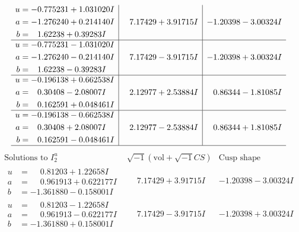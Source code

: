 \documentclass[1p]{elsarticle_modified}
\theoremstyle{definition}
\newcommand{\I}{\sqrt{-1}}
\begin{document}
$$\begin{array}{c|c|c}
\begin{aligned}
u &= -0.775231 + 1.031020 I \\
a &= -1.276240 + 0.214140 I \\
b &= \phantom{-}1.62238 + 0.39283 I\end{aligned}
 & \phantom{-}7.17429 + 3.91715 I & -1.20398 - 3.00324 I \\ \hline\begin{aligned}
u &= -0.775231 - 1.031020 I \\
a &= -1.276240 - 0.214140 I \\
b &= \phantom{-}1.62238 - 0.39283 I\end{aligned}
 & \phantom{-}7.17429 - 3.91715 I & -1.20398 + 3.00324 I \\ \hline\begin{aligned}
u &= -0.196138 + 0.662538 I \\
a &= \phantom{-}0.30408 - 2.08007 I \\
b &= \phantom{-}0.162591 + 0.048461 I\end{aligned}
 & \phantom{-}2.12977 + 2.53884 I & \phantom{-}0.86344 - 1.81085 I \\ \hline\begin{aligned}
u &= -0.196138 - 0.662538 I \\
a &= \phantom{-}0.30408 + 2.08007 I \\
b &= \phantom{-}0.162591 - 0.048461 I\end{aligned}
 & \phantom{-}2.12977 - 2.53884 I & \phantom{-}0.86344 + 1.81085 I\\
 \hline 
 \end{array}$$\newpage$$\begin{array}{c|c|c}  
\text{Solutions to }I^u_{2}& \I (\text{vol} + \sqrt{-1}CS) & \text{Cusp shape}\\
 \hline 
\begin{aligned}
u &= \phantom{-}0.81203 + 1.22658 I \\
a &= \phantom{-}0.961913 + 0.622177 I \\
b &= -1.361880 - 0.158001 I\end{aligned}
 & \phantom{-}7.17429 + 3.91715 I & -1.20398 - 3.00324 I \\ \hline\begin{aligned}
u &= \phantom{-}0.81203 - 1.22658 I \\
a &= \phantom{-}0.961913 - 0.622177 I \\
b &= -1.361880 + 0.158001 I\end{aligned}
 & \phantom{-}7.17429 - 3.91715 I & -1.20398 + 3.00324 I \\ \hline\begin{aligned}

\end{aligned}
\end{array}$$
\end{document}
